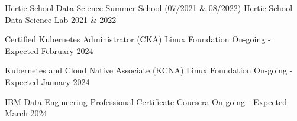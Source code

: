 

\begin{cvhonors}
    \cvhonor
      {Hertie School Data Science Summer School (07/2021 & 08/2022)} %
      {Hertie School Data Science Lab} %
      {} %
      {2021 & 2022} %

  \cvhonor
    {Certified Kubernetes Administrator (CKA)} %
    {Linux Foundation} %
    {} %
    {On-going - Expected February 2024} %

  \cvhonor
    {Kubernetes and Cloud Native Associate (KCNA)} %
    {Linux Foundation} %
    {} %
    {On-going - Expected January 2024} %

  \cvhonor
    {IBM Data Engineering Professional Certificate} %
    {Coursera} %
    {} %
    {On-going - Expected March 2024} %

\end{cvhonors}
